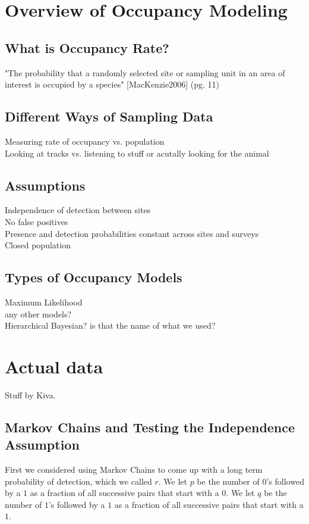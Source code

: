 \documentclass{article}
\begin{document}
\section{Overview of Occupancy Modeling}
	\subsection{What is Occupancy Rate?}
		"The probability that a randomly selected site or sampling unit in an area 
			of interest is occupied by a species" [MacKenzie2006] (pg. 11)
	\subsection{Different Ways of Sampling Data}
		Measuring rate of occupancy vs. population \\
		Looking at tracks vs. listening to stuff or acutally looking for the animal
	\subsection{Assumptions}
		Independence of detection between sites \\
		No false positives \\
		Presence and detection probabilities constant across sites and surveys \\
		Closed population
	\subsection{Types of Occupancy Models}
		Maximum Likelihood \\
		any other models? \\
		Hierarchical Bayesian?  is that the name of what we used?

\section{Actual data}
Stuff by Kiva.
	\subsection{Markov Chains and Testing the Independence Assumption}
		First we considered using Markov Chains to come up with a long term 
probability of detection, which we called \(r\).  We let \(p\) be the number of 
\(0\)'s followed by a \(1\) as a fraction of all successive pairs that start with 
a \(0\).  We let \(q\) be the number of \(1\)'s followed by a \(1\) as a fraction 
of all successive pairs that start with a \(1\).  
\end{document}
